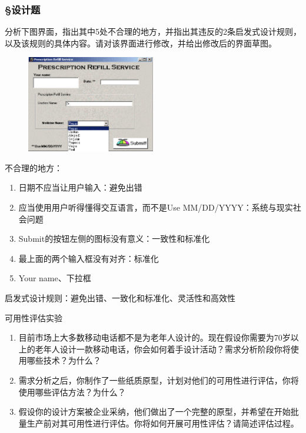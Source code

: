 \subsubsection*{\S 设计题}
\setcounter{problemname}{0}

\begin{problem}[2021]
分析下图界面，指出其中5处不合理的地方，并指出其违反的2条启发式设计规则，以及该规则的具体内容。请对该界面进行修改，并给出修改后的界面草图。
\begin{figure}[H]
    \vspace{-0.5em}
	\centering
	\includegraphics[width=0.5\textwidth]{1.png}
    \vspace{-1em}
\end{figure}
\end{problem}

\begin{solution}
不合理的地方：
\begin{enumerate}[label=\arabic*.]
    \item 日期不应当让用户输入：避免出错
    \item 应当使用用户听得懂得交互语言，而不是Use MM/DD/YYYY：系统与现实社会问题
    \item Submit的按钮左侧的图标没有意义：一致性和标准化
    \item 最上面的两个输入框没有对齐：标准化
    \item Your name、下拉框
\end{enumerate}

启发式设计规则：避免出错、一致化和标准化、灵活性和高效性
\end{solution}



\begin{problem}[2021、2023]
可用性评估实验
\begin{enumerate}[label=\arabic*.]
    \item 目前市场上大多数移动电话都不是为老年人设计的。现在假设你需要为70岁以上的老年人设计一款移动电话，你会如何着手设计活动？需求分析阶段你将使用哪些技术？为什么？
    \item 需求分析之后，你制作了一些纸质原型，计划对他们的可用性进行评估，你将使用哪些评估方法？为什么？
    \item 假设你的设计方案被企业采纳，他们做出了一个完整的原型，并希望在开始批量生产前对其可用性进行评估。你将如何开展可用性评估？请简述评估过程。
\end{enumerate}
\end{problem}

